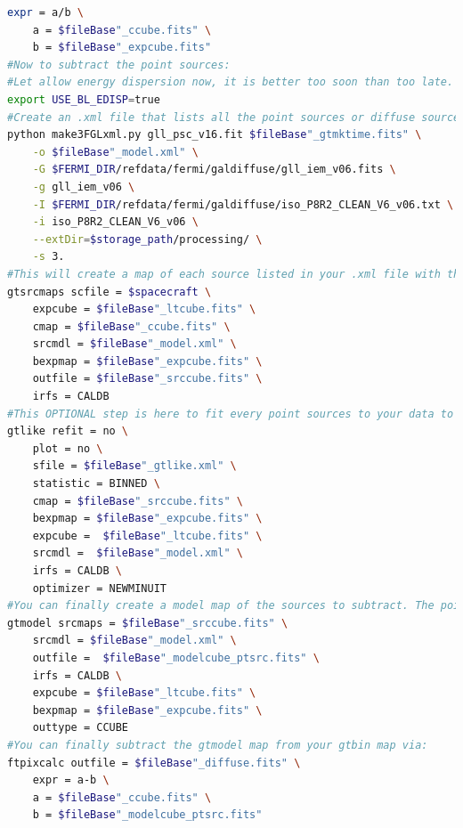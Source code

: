 \begin{lstlisting}[language=bash,caption={Bash script details for the treatment of the Fermi LAT data.},label={app:script}, breaklines=true]
    expr = a/b \
    a = $fileBase"_ccube.fits" \
    b = $fileBase"_expcube.fits"
#Now to subtract the point sources:
#Let allow energy dispersion now, it is better too soon than too late.
export USE_BL_EDISP=true
#Create an .xml file that lists all the point sources or diffuse sources you want to add to your model. Here I add all the point sources that could play a role in my maps (it knows it from the gtmktime file), but also the diffuse Fermi background (gll_iem_v06.fits) and the Fermi isotropic template (iso_P8R2_CLEAN_V6_v06.txt). You will have to comment them out by hand afterward in the $fileBase"_model.xml" file if you don't want them in your model. The point sources are taken from the 3FGL catalog (gll_psc_v16.fit), for a significance > 3.
python make3FGLxml.py gll_psc_v16.fit $fileBase"_gtmktime.fits" \
    -o $fileBase"_model.xml" \
    -G $FERMI_DIR/refdata/fermi/galdiffuse/gll_iem_v06.fits \
    -g gll_iem_v06 \
    -I $FERMI_DIR/refdata/fermi/galdiffuse/iso_P8R2_CLEAN_V6_v06.txt \
    -i iso_P8R2_CLEAN_V6_v06 \
    --extDir=$storage_path/processing/ \
    -s 3.
#This will create a map of each source listed in your .xml file with the same parameters than your gtbin map. You have to do it at least once for the diffuse sources, but point sources are done quickly and can be done later (via option ptsrc = yes/no). This can take some time and the output file is quickly very big with the point sources.
gtsrcmaps scfile = $spacecraft \
    expcube = $fileBase"_ltcube.fits" \
    cmap = $fileBase"_ccube.fits" \
    srcmdl = $fileBase"_model.xml" \
    bexpmap = $fileBase"_expcube.fits" \
    outfile = $fileBase"_srccube.fits" \
    irfs = CALDB
#This OPTIONAL step is here to fit every point sources to your data to try to improve the 3FGL catalog and subtract a better model. You obviously need all backgrounds from fermi, iso template point and diffuse sources. This will create a new improved .xml file with slightly different values for every point sources than the one created by make3FGLxml.py. This take A LOT of time for big regions and can not be done for the whole sky at once. If you want to do it you need to cut the sky in smaller regions and reassemble them again after. That might not be worth it...
gtlike refit = no \
	plot = no \
	sfile = $fileBase"_gtlike.xml" \
	statistic = BINNED \
	cmap = $fileBase"_srccube.fits" \
	bexpmap = $fileBase"_expcube.fits" \
	expcube =  $fileBase"_ltcube.fits" \
	srcmdl =  $fileBase"_model.xml" \
	irfs = CALDB \
	optimizer = NEWMINUIT
#You can finally create a model map of the sources to subtract. The point sources are calculated automatically if they are not found in the gtsrcmaps file.
gtmodel srcmaps = $fileBase"_srccube.fits" \
	srcmdl = $fileBase"_model.xml" \
	outfile =  $fileBase"_modelcube_ptsrc.fits" \
	irfs = CALDB \
	expcube = $fileBase"_ltcube.fits" \
	bexpmap = $fileBase"_expcube.fits" \
	outtype = CCUBE
#You can finally subtract the gtmodel map from your gtbin map via:
ftpixcalc outfile = $fileBase"_diffuse.fits" \
    expr = a-b \
    a = $fileBase"_ccube.fits" \
    b = $fileBase"_modelcube_ptsrc.fits"  
\end{lstlisting}


